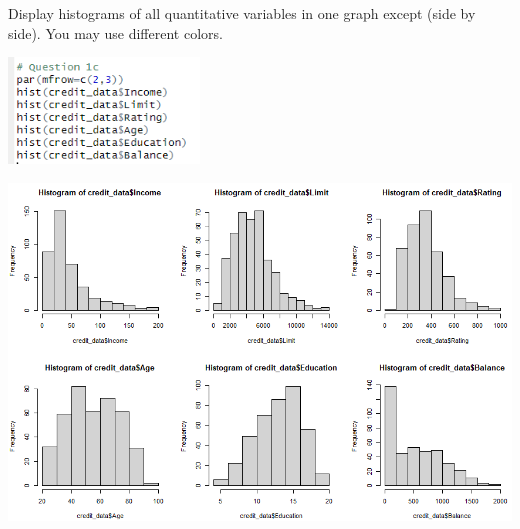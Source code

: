Display histograms of all quantitative variables in one graph except  (side by side). You may
use different colors.

\noindent \includegraphics[width=2in]{r_1c-1.PNG}

\noindent \includegraphics[width=6in]{r_1c-2.PNG}